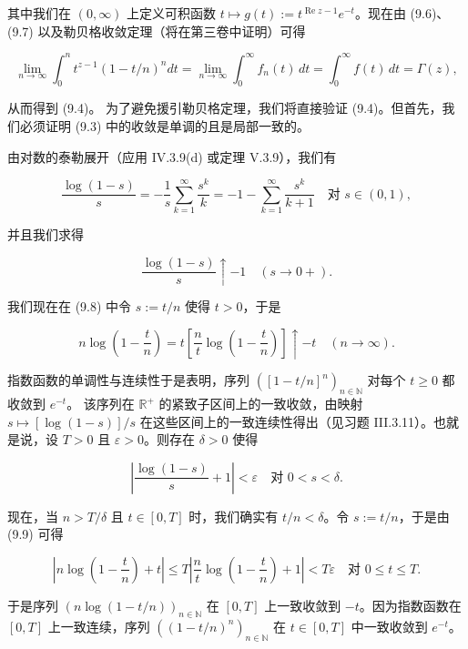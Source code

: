 \begin{theorem}
\begin{subitems}
其中我们在 $ (0, \infty) $ 上定义可积函数 $ t \mapsto g(t) := t^{\operatorname{Re} z-1} e^{-t} $。现在由 (9.6)、(9.7) 以及勒贝格收敛定理（将在第三卷中证明）可得

\[
\lim_{n \to \infty} \int_{0}^{n} t^{z-1} (1 - t/n)^{n} dt = \lim_{n \to \infty} \int_{0}^{\infty} f_n(t) \, dt = \int_{0}^{\infty} f(t) \, dt = \Gamma(z) ,
\]

从而得到 (9.4)。
为了避免援引勒贝格定理，我们将直接验证 (9.4)。但首先，我们必须证明 (9.3) 中的收敛是单调的且是局部一致的。

\item

由对数的泰勒展开（应用 IV.3.9(d) 或定理 V.3.9），我们有

\[
\frac{\log(1-s)}{s} = -\frac{1}{s} \sum_{k=1}^{\infty} \frac{s^{k}}{k} = -1 - \sum_{k=1}^{\infty} \frac{s^{k}}{k+1} \quad \text{对 } s \in (0, 1) ,
\]

并且我们求得

\begin{equation}
\frac{\log(1-s)}{s} \uparrow -1 \quad (s \to 0+) .\tag{9.8}
\end{equation}

我们现在在 (9.8) 中令 $ s := t/n $ 使得 $ t > 0 $，于是

\[
n \log\left( 1 - \frac{t}{n} \right) = t \left[ \frac{n}{t} \log\left( 1 - \frac{t}{n} \right) \right] \uparrow -t \quad (n \to \infty) .
\]

指数函数的单调性与连续性于是表明，序列 $ \left( [1 - t/n]^{n} \right)_{n \in \mathbb{N}} $ 对每个 $ t \ge 0 $ 都收敛到 $ e^{-t} $。
该序列在 $ \mathbb{R}^{+} $ 的紧致子区间上的一致收敛，由映射 $ s \mapsto [\log(1-s)]/s $ 在这些区间上的一致连续性得出（见习题 III.3.11）。也就是说，设 $ T > 0 $ 且 $ \varepsilon > 0 $。则存在 $ \delta > 0 $ 使得

\begin{equation}
\left| \frac{\log(1-s)}{s} + 1 \right| < \varepsilon \quad \text{对 } 0 < s < \delta .\tag{9.9}
\end{equation}

现在，当 $ n > T/\delta $ 且 $ t \in [0, T] $ 时，我们确实有 $ t/n < \delta $。令 $ s := t/n $，于是由 (9.9) 可得

\[
\left| n \log\left( 1 - \frac{t}{n} \right) + t \right| \le T \left| \frac{n}{t} \log\left( 1 - \frac{t}{n} \right) + 1 \right| < T\varepsilon \quad \text{对 } 0 \le t \le T .
\]

于是序列 $ \left( n \log(1 - t/n) \right)_{n \in \mathbb{N}} $ 在 $ [0, T] $ 上一致收敛到 $ -t $。因为指数函数在 $ [0, T] $ 上一致连续，序列 $ \left( (1 - t/n)^{n} \right)_{n \in \mathbb{N}} $ 在 $ t \in [0, T] $ 中一致收敛到 $ e^{-t} $。


\end{subitems}
\end{theorem}
